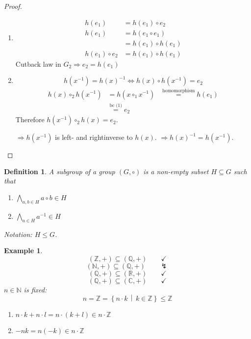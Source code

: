 \documentclass[a4paper,landscape,twocolumn]{article}
\newcommand\setdef[2]{\left\{#1\,\middle|\,#2\right\}}
\newcommand\nope{\lightning}
\newtheorem{defi}{Definition}
\newtheorem{ex}{Example}
\begin{document}
\begin{proof}
  \begin{enumerate}
    \item
      \begin{align*}
                  h(e_1) &= h(e_1) \circ e_2 \\
                  h(e_1) &= h(e_1 \circ e_1) \\
                         &= h(e_1) \circ h(e_1) \\
        h(e_1) \circ e_2 &= h(e_1) \circ h(e_1)
      \end{align*}
      Cutback law in $G_2 \Rightarrow e_2 = h(e_1)$

    \item
      \[ h(x^{-1}) = h(x)^{-1} \Leftrightarrow h(x) \circ h(x^{-1}) = e_2 \]
      \begin{align*}
        h(x) \circ_2 h(x^{-1}) &= h(x \circ_1 x^{-1})
          &\stackrel{\text{homomorphism}}{=} h(e_1) \\
          &\stackrel{\text{bc (1)}}{=} e_2
      \end{align*}
      Therefore $h(x^{-1}) \circ_2 h(x) = e_2$.

      $\Rightarrow h(x^{-1})$ is left- and rightinverse to $h(x)$.
      $\Rightarrow h(x)^{-1} = h(x^{-1})$.
  \end{enumerate}
\end{proof}

\begin{defi}
  \label{satz-2-22}
  A subgroup of a group $(G, \circ)$ is a non-empty subset $H \subseteq G$ such that
  \begin{enumerate}
    \item $\bigwedge_{a,b \in H} a \circ b \in H$
    \item $\bigwedge_{a \in H} a^{-1} \in H$
  \end{enumerate}
  Notation: $H \leq G$.
\end{defi}

\begin{ex}
  \[ (\mathbb Z, +) \subseteq (\mathbb Q, +) \qquad\checkmark \]
  \[ (\mathbb N, +) \subseteq (\mathbb Q, +) \qquad\nope \]
  \[ (\mathbb Q, +) \subseteq (\mathbb R, +) \qquad\checkmark \]
  \[ (\mathbb Q, +) \subseteq (\mathbb C, +) \qquad\checkmark \]
  $n \in \mathbb N$ is fixed:
  \[ n = \mathbb Z = \setdef{n \cdot k}{k \in \mathbb Z} \leq \mathbb Z \]
  \begin{enumerate}
    \item $n \cdot k + n \cdot l = n \cdot (k + l) \in n\cdot\mathbb Z$
    \item $-nk = n (-k) \in n\cdot\mathbb Z$
  \end{enumerate}
\end{ex}
\end{document}
